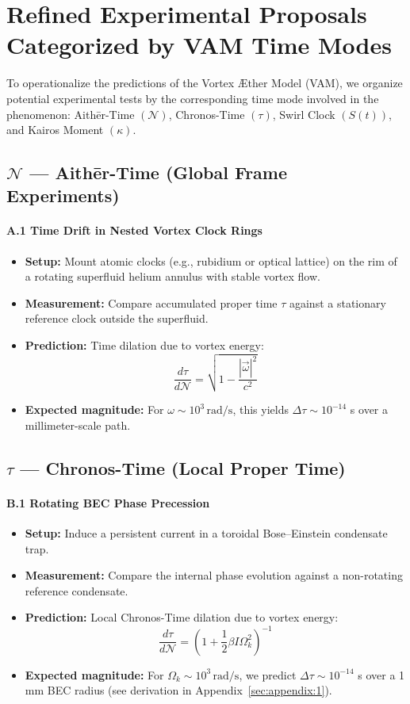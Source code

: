 \section{Refined Experimental Proposals Categorized by VAM Time Modes}

To operationalize the predictions of the Vortex \AE ther Model (VAM), we organize potential experimental tests by the corresponding time mode involved in the phenomenon: Aith\=er-Time \((\mathcal{N})\), Chronos-Time \((\tau)\), Swirl Clock \((S(t))\), and Kairos Moment \((\kappa)\).

\subsection*{\(\mathcal{N}\) --- Aith\=er-Time (Global Frame Experiments)}

\paragraph{A.1 Time Drift in Nested Vortex Clock Rings}
\begin{itemize}
    \item \textbf{Setup:} Mount atomic clocks (e.g., rubidium or optical lattice) on the rim of a rotating superfluid helium annulus with stable vortex flow.
    \item \textbf{Measurement:} Compare accumulated proper time \(\tau\) against a stationary reference clock outside the superfluid.
    \item \textbf{Prediction:} Time dilation due to vortex energy:
    \[
        \frac{d\tau}{d\mathcal{N}} = \sqrt{1 - \frac{|\vec{\omega}|^2}{c^2}}
    \]
    \item \textbf{Expected magnitude:} For \(\omega \sim 10^3 \, \mathrm{rad/s}\), this yields \(\Delta \tau \sim 10^{-14}\) s over a millimeter-scale path.
\end{itemize}

\subsection*{\(\tau\) --- Chronos-Time (Local Proper Time)}

\paragraph{B.1 Rotating BEC Phase Precession}
\begin{itemize}
    \item \textbf{Setup:} Induce a persistent current in a toroidal Bose--Einstein condensate trap.
    \item \textbf{Measurement:} Compare the internal phase evolution against a non-rotating reference condensate.
    \item \textbf{Prediction:} Local Chronos-Time dilation due to vortex energy:
    \[
        \frac{d\tau}{d\mathcal{N}} = \left(1 + \frac{1}{2} \beta I \Omega_k^2 \right)^{-1}
    \]
    \item \textbf{Expected magnitude:} For \( \Omega_k \sim 10^3 \, \mathrm{rad/s} \), we predict \( \Delta \tau \sim 10^{-14} \) s over a 1 mm BEC radius (see derivation in Appendix~\ref{sec:appendix:1}).
\end{itemize}

